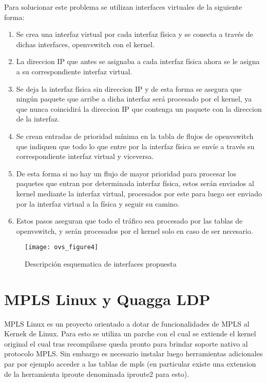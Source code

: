 \begin{enumerate}
Para solucionar este problema se utilizan interfaces virtuales de la siguiente forma:

\begin{enumerate}
\item Se crea una interfaz virtual por cada interfaz física y se conecta a través de dichas interfaces,  openvswitch con el kernel.

\item La direccion IP que antes se asignaba a cada interfaz física ahora se le asigna a su correspondiente interfaz virtual.

\item Se deja la interfaz física sin direccion IP y de esta forma se asegura que ningún paquete que arribe a dicha interfaz será procesado por el kernel, ya que nunca coincidirá la direccion IP que contenga un paquete con la direccion de la interfaz.

\item Se crean entradas de prioridad mínima en la tabla de flujos de openvswitch que indiquen que todo lo que entre por la interfaz física se envíe a través su correspondiente interfaz virtual y viceversa.

\item De esta forma si no hay un flujo de mayor prioridad para procesar los paquetes que entran por determinada interfaz física, estos serán enviados al kernel mediante la interfaz virtual, procesados por este para luego ser enviado por la interfaz virtual a la física y seguir su camino.

\item Estos pasos aseguran que todo el tráfico sea procesado por las tablas de openvswitch, y serán procesados por el kernel solo en caso de ser necesario.
\end{enumerate}

\begin{figure}[h] 
\centering    
\texttt{[image: ovs\_figure4]}
\caption[OVSInterfaces2]{Descripci\'on esquematica de interfaces propuesta}
\label{fig:OVSInterfaces2}
\end{figure}

\end{enumerate}

\section{MPLS Linux y Quagga LDP}
\label{apendiceB6}

MPLS Linux\cite{MplsLinux1} es un proyecto orientado a dotar de funcionalidades de MPLS al Kernek de Linux. 
Para esto se utiliza un parche con el cual se extiende el kernel original el cual tras recompilarse queda pronto para brindar soporte nativo al protocolo MPLS. Sin embargo es necesario instalar luego herramientas adicionales par por ejemplo acceder a las tablas de mpls (en particular existe una extension de la herramienta iproute denominada iproute2 para esto).\\

